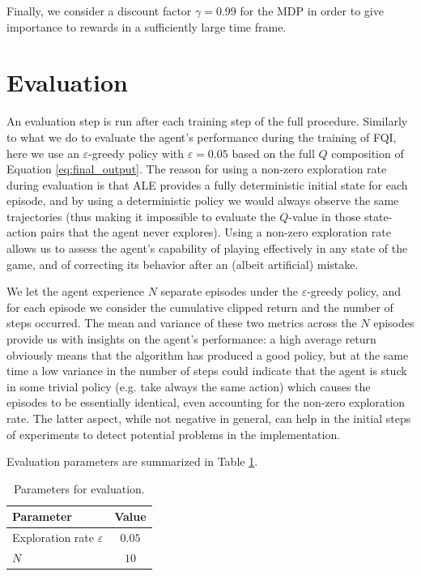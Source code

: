 Finally, we consider a discount factor $\gamma = 0.99$ for the MDP in order to 
give importance to rewards in a sufficiently large time frame. 

\section{Evaluation}
An evaluation step is run after each training step of the full procedure.
Similarly to what we do to evaluate the agent's performance during the training
of FQI, here we use an $\varepsilon$-greedy policy with $\varepsilon = 0.05$ 
based on the full $Q$ composition of Equation \eqref{eq:final_output}.
The reason for using a non-zero exploration rate during evaluation is that ALE
provides a fully deterministic initial state for each episode, and by using a 
deterministic policy we would always observe the same trajectories (thus making
it impossible to evaluate the $Q$-value in those state-action pairs that
the agent never explores). Using a non-zero exploration rate allows us to 
assess the agent's capability of playing effectively in any state of the game, 
and of correcting its behavior after an (albeit artificial) mistake.

We let the agent experience $N$ separate episodes under the $\varepsilon$-greedy 
policy, and for each episode we consider the cumulative clipped return and the
number of steps occurred. The mean and variance of these two metrics across the 
$N$ episodes provide us with insights on the agent's performance: a high average 
return obviously means that the algorithm has produced a good policy, but at the
same time a low variance in the number of steps could indicate that the agent is 
stuck in some trivial policy (e.g. take always the same action) which causes the
episodes to be essentially identical, even accounting for the non-zero 
exploration rate. The latter aspect, while not negative in general, can help in 
the initial steps of experiments to detect potential problems in the 
implementation.

Evaluation parameters are summarized in Table \ref{t:eval}.
%
\begin{table}[h]
    \centering
    \begin{tabular}{l c} 
	\hline
	Parameter & Value \\ 
	\hline 
	Exploration rate $\varepsilon$ & $0.05$ \\
	$N$ &  $10$ \\
	\hline
    \end{tabular}
    \caption[Parameters for evaluation]{Parameters for evaluation.}
    \label{t:eval}
\end{table}
%
